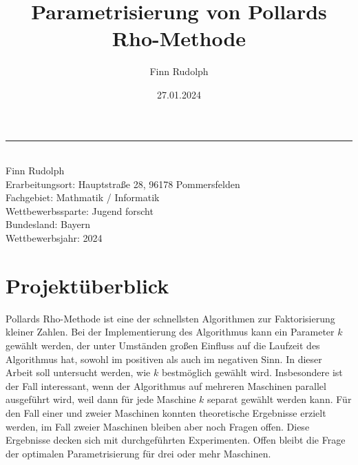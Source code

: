 \documentclass[a4paper, 11pt, ngerman]{article}
\title{Parametrisierung von Pollards Rho-Methode}
\author{Finn Rudolph}
\date{27.01.2024}
\begin{document}
\begin{titlepage}

    \noindent\rule{\textwidth}{0.4pt}

    \makeatletter
    \begin{flushleft}
        \textbf{\LARGE{\@title}} \\
        \vspace{1.5em}
        Finn Rudolph \\
        \vspace{1em}
        Erarbeitungsort: Hauptstraße 28, 96178 Pommersfelden \\
        Fachgebiet: Mathmatik / Informatik \\
        Wettbewerbssparte: Jugend forscht \\
        Bundesland: Bayern \\
        Wettbewerbsjahr: 2024
    \end{flushleft}

    \vspace{0.3em}

    \section*{Projektüberblick}

    Pollards Rho-Methode ist eine der schnellsten Algorithmen zur Faktorisierung kleiner Zahlen. Bei der Implementierung des Algorithmus kann ein Parameter $k$ gewählt werden, der unter Umständen großen Einfluss auf die Laufzeit des Algorithmus hat, sowohl im positiven als auch im negativen Sinn. In dieser Arbeit soll untersucht werden, wie $k$ bestmöglich gewählt wird. Insbesondere ist der Fall interessant, wenn der Algorithmus auf mehreren Maschinen parallel ausgeführt wird, weil dann für jede Maschine $k$ separat gewählt werden kann. Für den Fall einer und zweier Maschinen konnten theoretische Ergebnisse erzielt werden, im Fall zweier Maschinen bleiben aber noch Fragen offen. Diese Ergebnisse decken sich mit durchgeführten Experimenten. Offen bleibt die Frage der optimalen Parametrisierung für drei oder mehr Maschinen.

    \vspace{0.7em}

    \begin{spacing}{1.2}
        \tableofcontents
    \end{spacing}

    \thispagestyle{empty}

\end{titlepage}
\end{document}
